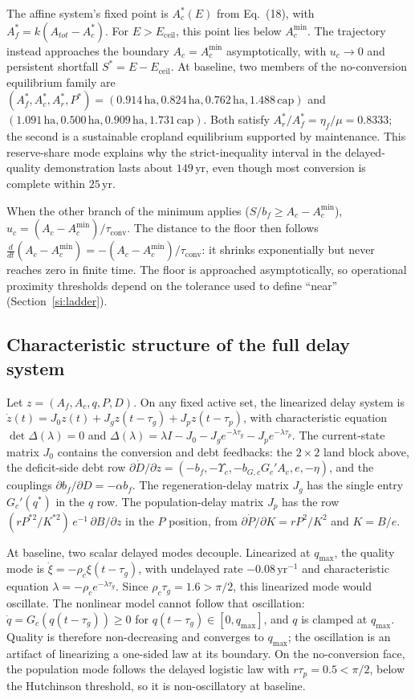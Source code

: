 \documentclass[11pt,a4paper]{article}
\newcommand{\Ups}{\Upsilon_c}
\newcommand{\Eceil}{E_{\mathrm{ceil}}}
\newcommand{\Acmin}{A_c^{\min}}
\newcommand{\tconv}{\tau_{\mathrm{conv}}}
\begin{document}
The affine system's fixed point is $A_c^*(E)$ from Eq.~(18), with $A_f^*=k(A_{tot}-A_c^*)$. For $E>\Eceil$, this point lies below $\Acmin$. The trajectory instead approaches the boundary $A_c=\Acmin$ asymptotically, with $u_c\to0$ and persistent shortfall $S^*=E-\Eceil$. At baseline, two members of the no-conversion equilibrium family are $(A_f^*,A_c^*,A_r^*,P^*)=(0.914\,\mathrm{ha},0.824\,\mathrm{ha},0.762\,\mathrm{ha},1.488\,\mathrm{cap})$ and $(1.091\,\mathrm{ha},0.500\,\mathrm{ha},0.909\,\mathrm{ha},1.731\,\mathrm{cap})$. Both satisfy $A_r^*/A_f^*=\eta_f/\mu=0.8333$; the second is a sustainable cropland equilibrium supported by maintenance. This reserve-share mode explains why the strict-inequality interval in the delayed-quality demonstration lasts about $149$\,yr, even though most conversion is complete within $25$\,yr.

When the other branch of the minimum applies ($S/b_f\ge A_c-\Acmin$), $u_c=(A_c-\Acmin)/\tconv$. The distance to the floor then follows $\frac{d}{dt}(A_c-\Acmin)=-(A_c-\Acmin)/\tconv$: it shrinks exponentially but never reaches zero in finite time. The floor is approached asymptotically, so operational proximity thresholds depend on the tolerance used to define “near” (Section~\ref{si:ladder}).

\subsection{Characteristic structure of the full delay system}\label{si:char}

Let $z=(A_f,A_c,q,P,D)$. On any fixed active set, the linearized delay system is $\dot z(t)=J_0z(t)+J_gz(t-\tau_g)+J_pz(t-\tau_p)$, with characteristic equation $\det\Delta(\lambda)=0$ and $\Delta(\lambda)=\lambda I-J_0-J_ge^{-\lambda\tau_g}-J_pe^{-\lambda\tau_p}$. The current-state matrix $J_0$ contains the conversion and debt feedbacks: the $2\times2$ land block above, the deficit-side debt row $\partial\dot D/\partial z=(-b_f,-\Ups,-b_{G,c}G_c'A_c,e,-\eta)$, and the couplings $\partial b_f/\partial D=-\alpha b_f$. The regeneration-delay matrix $J_g$ has the single entry $G_c'(q^*)$ in the $q$ row. The population-delay matrix $J_p$ has the row $(rP^{*2}/K^{*2})\,e^{-1}\,\partial B/\partial z$ in the $P$ position, from $\partial\dot P/\partial K=rP^2/K^2$ and $K=B/e$.

At baseline, two scalar delayed modes decouple. Linearized at $q_{\max}$, the quality mode is $\dot\xi=-\rho_c\xi(t-\tau_g)$, with undelayed rate $-0.08\,\mathrm{yr}^{-1}$ and characteristic equation $\lambda=-\rho_ce^{-\lambda\tau_g}$. Since $\rho_c\tau_g=1.6>\pi/2$, this linearized mode would oscillate. The nonlinear model cannot follow that oscillation: $\dot q=G_c(q(t-\tau_g))\ge0$ for $q(t-\tau_g)\in[0,q_{\max}]$, and $q$ is clamped at $q_{\max}$. Quality is therefore non-decreasing and converges to $q_{\max}$; the oscillation is an artifact of linearizing a one-sided law at its boundary. On the no-conversion face, the population mode follows the delayed logistic law with $r\tau_p=0.5<\pi/2$, below the Hutchinson threshold, so it is non-oscillatory at baseline.
\end{document}
